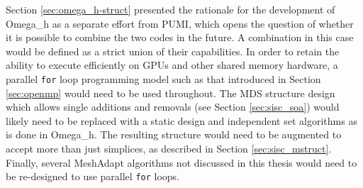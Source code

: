 Section \ref{sec:omega_h-struct} presented the rationale
for the development of Omega\_h as a separate effort from PUMI,
which opens the question of whether it is possible
to combine the two codes in the future.
A combination in this case would be defined as a strict
union of their capabilities.
In order to retain the ability to execute efficiently
on GPUs and other shared memory hardware, a parallel
\texttt{for} loop programming model such as that introduced
in Section \ref{sec:openmp} would need to be used throughout.
The MDS structure design which allows single additions
and removals (see Section \ref{sec:sisc_soa}) would likely
need to be replaced with a static design and independent
set algorithms as is done in Omega\_h.
The resulting structure would need to be augmented to
accept more than just simplices, as described in Section \ref{sec:sisc_mstruct}.
Finally, several MeshAdapt algorithms not discussed
in this thesis would need to be re-designed to use parallel
\texttt{for} loops.

